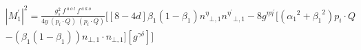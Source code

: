 
\begin{equation}
\begin{split}
&{|{M}^{\prime}_1|}^2 =\frac{g_s^2 \:f^{\:a\:o\:l}\: f^{\:a\:k\:o}}{4y\:(p_i\cdot Q) \:(p_i\cdot Q)}[[8-4d]{\beta_1}(1-\beta_1){n^{{\eta}}}_{\bot,1}{n^{{\eta}^{\prime}}}_{\bot,1}-8g^{{\eta}{{\eta}^{\prime}}}[({\alpha_1}^2+{\beta_1}^2) p_i \cdot Q\\
&- ({\beta_1}(1-\beta_1)){n}_{\bot,1}\cdot{n}_{\bot,1}][g^{{\gamma}{{\delta}}}]]
\end{split}
\end{equation}

